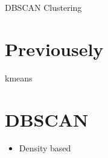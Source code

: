 \begin{frame}{DBSCAN Clustering}
    \section{Previousely}
        kmeans
    
    
    \section{DBSCAN}
        \begin{itemize}
            \item Density based
        \end{itemize}

\end{frame}